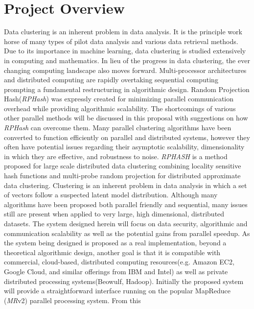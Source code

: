 \documentclass[a4paper,10pt]{article}
\begin{document}
\section{Project Overview}
Data clustering is
 an inherent problem in data analysis.	It is the principle work horse of many
 types of pilot data analysis and various data retrieval methods.  Due to
 its importance in machine learning, data clustering is studied extensively
 in computing and mathematics\cite{anderberg1973,Samet}.  In lieu of the
 progress in data clustering,
the ever changing computing landscape also moves forward.  Multi-processor
architectures
 and distributed computing are rapidly overtaking sequential computing
 prompting a fundamental restructuring in algorithmic design\cite{waldo1997}.
 Random Projection Hash(\emph{RPHash}) was expressly created for minimizing
 parallel communication overhead while providing algorithmic scalability.
 The shortcomings of various other parallel methods will be discussed in
 this proposal with suggestions on how \emph{RPHash} can overcome them.
 Many parallel clustering algorithms have been converted to function
 efficiently on parallel and distributed systems, however they often have
 potential issues regarding their asymptotic scalability\cite{Proclus},
 dimensionality in which they are effective\cite{Clarans}, and robustness
 to noise.
\emph{RPHASH} is a method proposed for large scale distributed data clustering
combining locality sensitive hash functions and multi-probe random projection
for distributed approximate data clustering.  Clustering is an inherent
problem in data analysis in which a set of vectors follow a suspected latent
model distribution\cite{latent1,Hofmann,clusterstats,Zass2005}.  Although
many algorithms have been proposed both parallel friendly and sequential,
many issues still are present when applied to very large, high dimensional,
distributed datasets\cite{Clarans,Proclus,mpicluster,distributeddata,parclus}.
The system designed herein will focus on data security, algorithmic and
communication scalability as well as the potential gains from parallel speedup.
As the system being designed is proposed as a real implementation, beyond a
theoretical algorithmic design, another goal is that it is compatible with
commercial, cloud-based, distributed computing resources(e.g.  Amazon EC2,
Google Cloud, and similar offerings from IBM and Intel) as well as private
distributed processing systems(Beowulf, Hadoop).  Initially the proposed system
will provide a straightforward interface running on the popular MapReduce
(\emph{MR}v2)\cite{mapreduce,hadoop} parallel processing system.  From this
\end{document}
